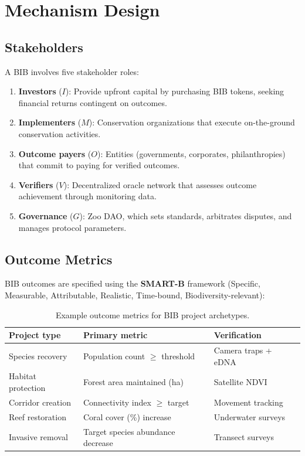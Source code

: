 \section{Mechanism Design}

\label{sec:mechanism}

\subsection{Stakeholders}

A BIB involves five stakeholder roles:

\begin{enumerate}
  \item \textbf{Investors} ($I$): Provide upfront capital by purchasing
    BIB tokens, seeking financial returns contingent on outcomes.
  \item \textbf{Implementers} ($M$): Conservation organizations that
    execute on-the-ground conservation activities.
  \item \textbf{Outcome payers} ($O$): Entities (governments,
    corporates, philanthropies) that commit to paying for verified
    outcomes.
  \item \textbf{Verifiers} ($V$): Decentralized oracle network that
    assesses outcome achievement through monitoring data.
  \item \textbf{Governance} ($G$): Zoo DAO, which sets standards,
    arbitrates disputes, and manages protocol parameters.
\end{enumerate}

\subsection{Outcome Metrics}

BIB outcomes are specified using the \textbf{SMART-B} framework
(Specific, Measurable, Attributable, Realistic, Time-bound,
Biodiversity-relevant):

\begin{table}[H]
\centering
\caption{Example outcome metrics for BIB project archetypes.}
\label{tab:metrics}
\begin{tabular}{p{3cm}p{4cm}p{4cm}}
\toprule
\textbf{Project type} & \textbf{Primary metric} & \textbf{Verification} \\
\midrule
Species recovery & Population count $\geq$ threshold & Camera traps + eDNA \\
Habitat protection & Forest area maintained (ha) & Satellite NDVI \\
Corridor creation & Connectivity index $\geq$ target & Movement tracking \\
Reef restoration & Coral cover (\%) increase & Underwater surveys \\
Invasive removal & Target species abundance decrease & Transect surveys \\
\bottomrule
\end{tabular}
\end{table}

